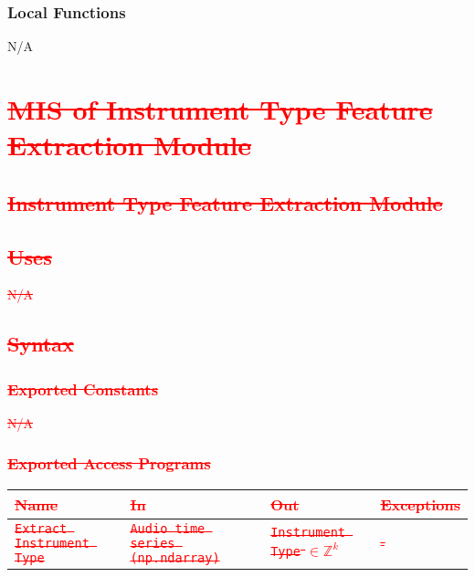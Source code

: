 \documentclass[12pt, titlepage]{article}
\begin{document}
\subsubsection{Local Functions}
N/A


\section{\textcolor{red}{\sout{MIS of Instrument Type Feature Extraction Module}}} 

\subsection{\textcolor{red}{\sout{Instrument Type Feature Extraction Module}}}

\subsection{\textcolor{red}{\sout{Uses}}}
\textcolor{red}{\sout{N/A}}

\subsection{\textcolor{red}{\sout{Syntax}}}

\subsubsection{\textcolor{red}{\sout{Exported Constants}}}
\textcolor{red}{\sout{N/A}}

\subsubsection{\textcolor{red}{\sout{Exported Access Programs}}}

\begin{center}
\begin{tabular}{p{2cm} p{4cm} p{4cm} p{2cm}}
\hline
\textcolor{red}{\sout{\textbf{Name}}} & \textcolor{red}{\sout{\textbf{In}}} & \textcolor{red}{\sout{\textbf{Out}}} & \textcolor{red}{\sout{\textbf{Exceptions}}}\\
\hline
\textcolor{red}{\sout{\texttt{Extract Instrument Type}}} & \textcolor{red}{\sout{\texttt{Audio time series (np.ndarray)}}} & \textcolor{red}{\sout{\texttt{Instrument Type} $\in \mathbb{Z}^k$}} & \textcolor{red}{\sout{-}}\\
\hline
\end{tabular}
\end{center}
\end{document}
